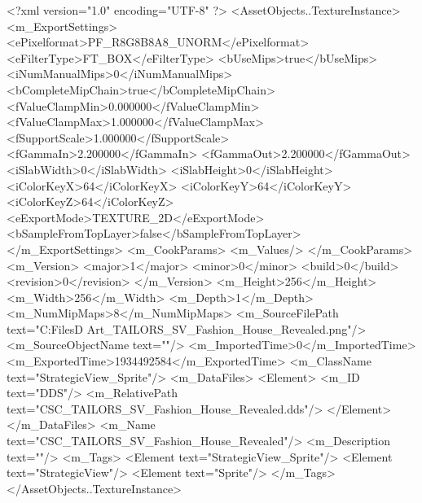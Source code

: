 <?xml version="1.0" encoding="UTF-8" ?>
<AssetObjects..TextureInstance>
	<m_ExportSettings>
		<ePixelformat>PF_R8G8B8A8_UNORM</ePixelformat>
		<eFilterType>FT_BOX</eFilterType>
		<bUseMips>true</bUseMips>
		<iNumManualMips>0</iNumManualMips>
		<bCompleteMipChain>true</bCompleteMipChain>
		<fValueClampMin>0.000000</fValueClampMin>
		<fValueClampMax>1.000000</fValueClampMax>
		<fSupportScale>1.000000</fSupportScale>
		<fGammaIn>2.200000</fGammaIn>
		<fGammaOut>2.200000</fGammaOut>
		<iSlabWidth>0</iSlabWidth>
		<iSlabHeight>0</iSlabHeight>
		<iColorKeyX>64</iColorKeyX>
		<iColorKeyY>64</iColorKeyY>
		<iColorKeyZ>64</iColorKeyZ>
		<eExportMode>TEXTURE_2D</eExportMode>
		<bSampleFromTopLayer>false</bSampleFromTopLayer>
	</m_ExportSettings>
	<m_CookParams>
		<m_Values/>
	</m_CookParams>
	<m_Version>
		<major>1</major>
		<minor>0</minor>
		<build>0</build>
		<revision>0</revision>
	</m_Version>
	<m_Height>256</m_Height>
	<m_Width>256</m_Width>
	<m_Depth>1</m_Depth>
	<m_NumMipMaps>8</m_NumMipMaps>
	<m_SourceFilePath text="C:\Users\Shadow\Desktop\Working Files\2D Art\Quarters\Tailors\StrategicView\CSC_TAILORS_SV_Fashion_House_Revealed.png"/>
	<m_SourceObjectName text=""/>
	<m_ImportedTime>0</m_ImportedTime>
	<m_ExportedTime>1934492584</m_ExportedTime>
	<m_ClassName text="StrategicView_Sprite"/>
	<m_DataFiles>
		<Element>
			<m_ID text="DDS"/>
			<m_RelativePath text="CSC_TAILORS_SV_Fashion_House_Revealed.dds"/>
		</Element>
	</m_DataFiles>
	<m_Name text="CSC_TAILORS_SV_Fashion_House_Revealed"/>
	<m_Description text=""/>
	<m_Tags>
		<Element text="StrategicView_Sprite"/>
		<Element text="StrategicView"/>
		<Element text="Sprite"/>
	</m_Tags>
</AssetObjects..TextureInstance>

